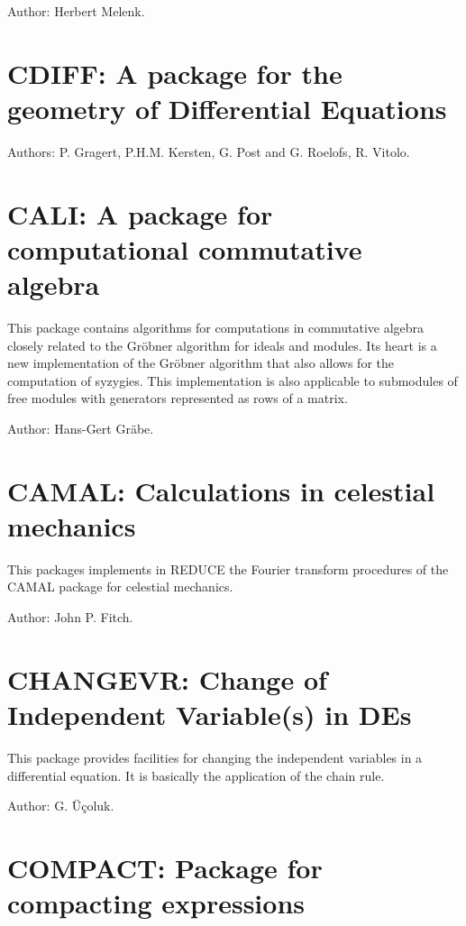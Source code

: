 Author: Herbert Melenk.


\section{CDIFF: A package for the geometry of Differential Equations}
\label{CDIFF}


Authors: P. Gragert, P.H.M. Kersten, G. Post and G. Roelofs, R. Vitolo.


\section{CALI: A package for computational commutative algebra}

This package contains algorithms for computations in commutative algebra
closely related to the Gr\"obner algorithm for ideals and modules.  Its
heart is a new implementation of the Gr\"obner algorithm that also allows
for the computation of syzygies.  This implementation is also applicable to
submodules of free modules with generators represented as rows of a matrix.

Author: Hans-Gert Gr\"abe.

\section{CAMAL: Calculations in celestial mechanics} 
\label{CAMAL}

This packages implements in REDUCE the Fourier transform procedures of the
CAMAL package for celestial mechanics.

Author: John P. Fitch.

\section{CHANGEVR: Change of Independent Variable(s) in DEs}

This package provides facilities for changing the independent variables in
a differential equation. It is basically the application of the chain rule.

Author: G. \"{U}\c{c}oluk.

\section{COMPACT: Package for compacting expressions} 

